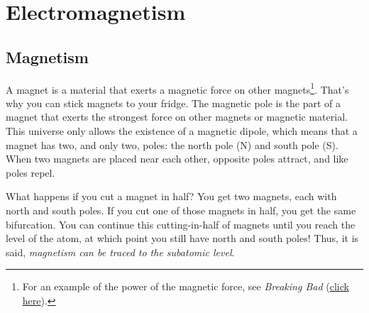 \documentclass[main.tex]{subfiles}
\begin{document}
\section{Electromagnetism}

\subsection{Magnetism} \label{24h7hD}

A magnet is a material that exerts a magnetic force on other magnets\footnote{For an example of the power of the magnetic force, see \textit{Breaking Bad} (\href{https://youtu.be/gzCXowhks80?t=4}{click here}).}. That's why you can stick magnets to your fridge. The \gls{magnetic pole} is the part of a magnet that exerts the strongest force on other magnets or magnetic material. This universe only allows the existence of a \gls{magnetic dipole}, which means that a magnet has two, and only two, poles: the \gls{north pole} (N) and \gls{south pole} (S). When two magnets are placed near each other, opposite poles attract, and like poles repel.

\begin{center}
    \captionsetup{type=figure,margin=1in}
\end{center}


What happens if you cut a magnet in half? You get two magnets, each with north and south poles. If you cut one of those magnets in half, you get the same bifurcation. You can continue this cutting-in-half of magnets until you reach the level of the atom, at which point you still have north and south poles! Thus, it is said, \textit{magnetism can be traced to the subatomic level}.
\end{document}
